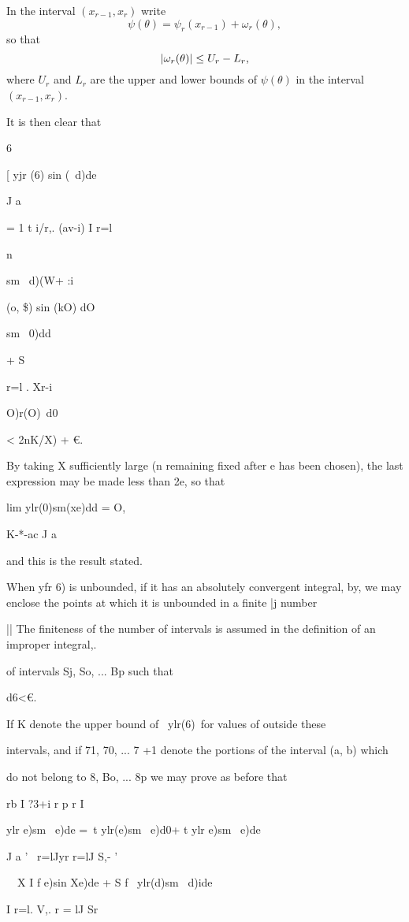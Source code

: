 In the interval $(x_{r-1}, x_{r})$ write
$$
\psi(\theta) = \psi_{r}(x_{r-1}) + \omega_{r}(\theta),
$$
so that
$$
\left|  \omega_{r}(\theta)  \right| \leq U_{r} - L_{r},
$$
where $U_{r}$ and $L_{r}$ are the upper and lower bounds of
$\psi(\theta)$ in the interval
$(x_{r-1}, x_{r})$.

It is then clear that

6

[ yjr (6) sin (\ d)de

J a

= 1 t i/r,. (av-i) I r=l

n

sm \ d)(W+ :i

(o, \$) sin (kO) dO

sm \ 0)dd

+ S

r=l . Xr-i

O)r(O)\ d0

< 2nK/X) + €.

By taking X sufficiently large (n remaining fixed after e has been
chosen), the last expression may be made less than 2e, so that

lim ylr(0)sm(xe)dd = O,

K-*-ac J a

and this is the result stated.

When yfr 6) is unbounded, if it has an absolutely convergent integral,
by, we may enclose the points at which it is unbounded in a
finite |j number

|| The finiteness of the number of intervals is assumed in the
definition of an improper integral,.

%
%

of intervals Sj, So, ... Bp such that

d6<€.

If K denote the upper bound of \ ylr(6)\ for values of outside these

intervals, and if 71, 70, ... 7 +1 denote the portions of the interval
(a, b) which

do not belong to 8, Bo, ... 8p we may prove as before that

rb I ?3+i r p r I

ylr e)sm \ e)de =\ t ylr(e)sm \ e)d0+ t ylr e)sm \ e)de\

J a ' \ r=lJyr r=lJ S,- '

 \ \ X I f e)sin Xe)de + S f \ ylr(d)sm \ d)ide

I r=l. V,. r = lJ Sr

